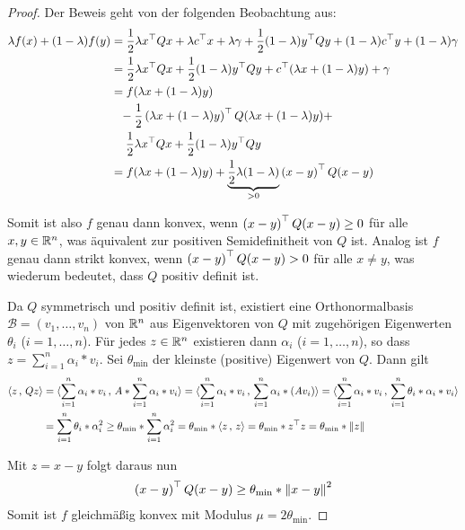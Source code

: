 \begin{proof}
	Der Beweis geht von der folgenden Beobachtung aus:
	\begin{align*}
		\lambda f(x) + (1-\lambda) f(y)
		&= \frac{1}{2} \lambda x^{\top} Q x + \lambda c^{\top} x + \lambda \gamma + \frac{1}{2} (1-\lambda) y^{\top} Q y + (1-\lambda) c^{\top} y + (1-\lambda) \gamma \\
		&= \frac{1}{2} \lambda x^{\top} Q x + \frac{1}{2} (1-\lambda) y^{\top} Q y + c^{\top} (\lambda x + (1-\lambda) y) + \gamma \\
		&= f(\lambda x + (1 - \lambda) y) \\
		&\phantom{=} - \frac{1}{2} \left( \lambda x + (1 - \lambda) y \right)^{\top} Q (\lambda x + (1 - \lambda) y) + \\
		&\phantom{=} \enskip \frac{1}{2} \lambda x^{\top} Q x + \frac{1}{2} (1-\lambda) y^{\top} Q y\\
		&= f(\lambda x + (1 - \lambda) y) + \underbrace{\frac{1}{2} \lambda (1-\lambda)}_{> 0} \left( x-y \right)^{\top} Q (x-y)
	\end{align*}

	Somit ist also $f$ genau dann konvex, wenn $\left( x-y \right)^{\top} Q (x-y) \geq 0$ für alle $x,y \in \mathbb{R}^n$, was äquivalent zur positiven Semidefinitheit von $Q$ ist. Analog ist $f$ genau dann strikt konvex, wenn $\left( x-y \right)^{\top} Q (x-y) > 0$ für alle $x \neq y$, was wiederum bedeutet, dass $Q$ positiv definit ist.
	
	Da $Q$ symmetrisch und positiv definit ist, existiert eine Orthonormalbasis $\mathcal{B} = (v_1 , \dots , v_n)$ von $\mathbb{R}^n$ aus Eigenvektoren von $Q$ mit zugehörigen Eigenwerten $\theta_i$ ($i=1, \dots , n$). Für jedes $z \in \mathbb{R}^n$ existieren dann $\alpha_i$ ($i = 1,\dots, n$), so dass $z = \sum_{i=1}^n \alpha_i * v_i$. Sei $\theta_{\min}$ der kleinste (positive) Eigenwert von $Q$. Dann gilt
	\begin{align*}
		\langle z\, ,\, Qz \rangle 
		&= \langle \sum_{i=1}^n \alpha_i * v_i\, ,\, A * \sum_{i=1}^n \alpha_i * v_i \rangle
		= \langle \sum_{i=1}^n \alpha_i * v_i\, ,\, \sum_{i=1}^n \alpha_i * (A v_i) \rangle 
		= \langle \sum_{i=1}^n \alpha_i * v_i\, ,\, \sum_{i=1}^n \theta_i * \alpha_i * v_i \rangle \\
		&= \sum_{i=1}^n \theta_i * \alpha_i^2 
		\geq \theta_{\min} * \sum_{i=1}^n \alpha_i^2
		= \theta_{\min} * \langle z\, ,\, z \rangle = \theta_{\min} * z^{\top}z = \theta_{\min} * \left\lVert z \right\rVert
	\end{align*}
	
	Mit $z = x-y$ folgt daraus nun
	\begin{align*}
		\left( x-y \right)^{\top} Q (x-y) \geq \theta_{\min} * \left\lVert x-y \right\rVert^2
	\end{align*}
	Somit ist $f$ gleichmäßig konvex mit Modulus $\mu = 2 \theta_{\min}$.
\end{proof}


